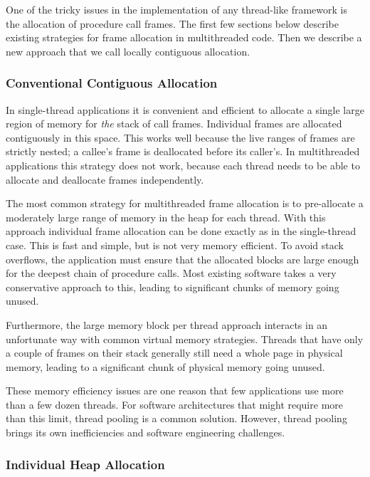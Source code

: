 \documentclass[10pt,preprint]{sigplanconf}
\begin{document}
One of the tricky issues in the implementation of any thread-like framework is the allocation of procedure call frames.
The first few sections below describe existing strategies for frame allocation in multithreaded code.
Then we describe a new approach that we call locally contiguous allocation.

\subsubsection{Conventional Contiguous Allocation}

In single-thread applications it is convenient and efficient to allocate a single large region of memory for \emph{the} stack of call frames.
Individual frames are allocated contiguously in this space.
This works well because the live ranges of frames are strictly nested; a callee's frame is deallocated before its caller's.
In multithreaded applications this strategy does not work, because each thread needs to be able to allocate and deallocate frames independently.

The most common strategy for multithreaded frame allocation is to pre-allocate a moderately large range of memory in the heap for each thread.
With this approach individual frame allocation can be done exactly as in the single-thread case.
This is fast and simple, but is not very memory efficient.
To avoid stack overflows, the application must ensure that the allocated blocks are large enough for the deepest chain of procedure calls.
Most existing software takes a very conservative approach to this, leading to significant chunks of memory going unused.

Furthermore, the large memory block per thread approach interacts in an unfortunate way with common virtual memory strategies.
Threads that have only a couple of frames on their stack generally still need a whole page in physical memory, leading to a significant chunk of physical memory going unused.

These memory efficiency issues are one reason that few applications use more than a few dozen threads.
For software architectures that might require more than this limit, thread pooling is a common solution.
However, thread pooling brings its own inefficiencies and software engineering challenges.

\subsubsection{Individual Heap Allocation}
\end{document}
